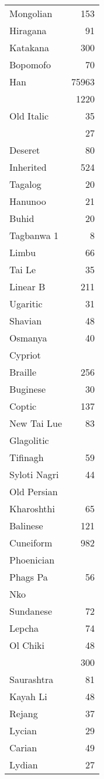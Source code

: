\begin{longtable}{p{6cm}r}
Mongolian	&153\\
Hiragana	&91\\
Katakana	&300\\
Bopomofo	&70\\
Han	 &75963\\
\nameref{s:yi}	&1220\\
Old Italic	&35\\
\nameref{s:gothic}	 &27\\
Deseret	&80\\
Inherited	&524\\
Tagalog	&20\\
Hanunoo	&21\\
Buhid	&20\\
Tagbanwa	1&8\\
Limbu	&66\\
Tai Le	 &35\\
Linear B	&211\\
Ugaritic	&31\\
Shavian	&48\\
Osmanya	&40\\
Cypriot	&\pageref{s:cypriot}\\
Braille	&256\\
Buginese	&30\\
Coptic	 &137\\
New Tai Lue	&83\\
Glagolitic	&\pageref{s:glagolitic}\\
Tifinagh	&59\\
Syloti Nagri	&44\\
Old Persian	& \pageref{s:oldpersian}\\
Kharoshthi	&65\\
Balinese	&121\\
Cuneiform	&982\\
Phoenician	&\pageref{phoenician}\\
Phags Pa	&56\\
Nko	 &\pageref{s:nko}\\
Sundanese	&72\\
Lepcha	 &74\\
Ol Chiki	&48\\
\nameref{s:vai}	&300\\
Saurashtra	&81\\
Kayah Li	&48\\
Rejang	 &37\\
Lycian	 &29\\
Carian	 &49 \pageref{carian}\\
Lydian	 &27\\

\end{longtable}
